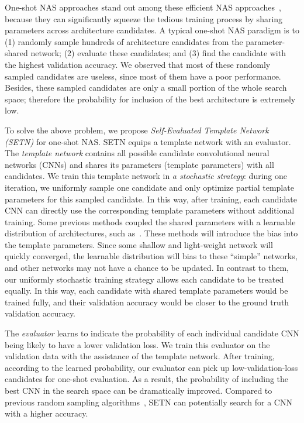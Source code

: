 \documentclass[10pt,twocolumn,letterpaper]{article}
\def\NAME{{SETN}}
\begin{document}
One-shot NAS approaches stand out among these efficient NAS approaches~\cite{bender2018understanding,brock2018smash}, because they can significantly squeeze the tedious training process by sharing parameters across architecture candidates.
A typical one-shot NAS paradigm is to (1) randomly sample hundreds of architecture candidates {from the parameter-shared network}; (2) evaluate these candidates; and (3) find the candidate with the highest validation accuracy.
We observed that most of these randomly sampled candidates are useless, since most of them have a poor performance. Besides, these sampled candidates are only a small portion of the whole search space; therefore {the probability for inclusion of the best architecture is extremely low}.



To solve the above problem, we propose \textit{Self-Evaluated Template Network ({\NAME})} for one-shot NAS.
{\NAME} equips a template network with an evaluator.
The \textit{template network} contains all possible candidate convolutional neural networks (CNNs) and shares its parameters (template parameters) with all candidates. We train this template network in \textit{a stochastic strategy}: during one iteration, we uniformly sample one candidate and only optimize partial template parameters for this sampled candidate. In this way, after training, each candidate CNN can directly use the corresponding template parameters without additional training.
Some previous methods coupled the shared parameters with a learnable distribution of architectures, such as~\cite{liu2019darts,dong2019search,pmlr-v80-pham18a}.
These methods will introduce the bias into the template parameters.
Since some shallow and light-weight network will quickly converged, the learnable distribution will bias to these ``simple'' networks, and other networks may not have a chance to be updated.
In contrast to them, our uniformly stochastic training strategy allows each candidate to be treated equally. In this way, each candidate with shared template parameters would be trained fully, and their validation accuracy would be closer to the ground truth validation accuracy.


The \textit{evaluator} learns to indicate the probability of each individual candidate CNN being likely to have a lower validation loss. We train this evaluator on the validation data with the assistance of the template network.
After training, according to the learned probability, our evaluator can pick up low-validation-loss candidates for one-shot evaluation.
As a result, the probability of including the best CNN in the search space can be dramatically improved.
Compared to previous random sampling algorithms~\cite{bender2018understanding,brock2018smash}, {\NAME} can potentially search for a CNN with a higher accuracy.
\end{document}
